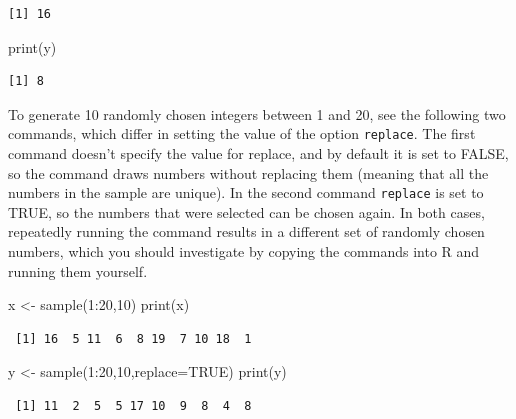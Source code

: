 \documentclass[
  letterpaper,
  DIV=11,
  numbers=noendperiod]{scrreprt}
\newenvironment{Shaded}{\begin{snugshade}}{\end{snugshade}}
\newcommand{\AttributeTok}[1]{\textcolor[rgb]{0.40,0.45,0.13}{#1}}
\newcommand{\ConstantTok}[1]{\textcolor[rgb]{0.56,0.35,0.01}{#1}}
\newcommand{\DecValTok}[1]{\textcolor[rgb]{0.68,0.00,0.00}{#1}}
\newcommand{\FunctionTok}[1]{\textcolor[rgb]{0.28,0.35,0.67}{#1}}
\newcommand{\NormalTok}[1]{\textcolor[rgb]{0.00,0.23,0.31}{#1}}
\newcommand{\OtherTok}[1]{\textcolor[rgb]{0.00,0.23,0.31}{#1}}
\newcommand{\SpecialCharTok}[1]{\textcolor[rgb]{0.37,0.37,0.37}{#1}}
\begin{document}
\begin{verbatim}
[1] 16
\end{verbatim}

\begin{Shaded}
\begin{Highlighting}[]
\FunctionTok{print}\NormalTok{(y)}
\end{Highlighting}
\end{Shaded}

\begin{verbatim}
[1] 8
\end{verbatim}

To generate 10 randomly chosen integers between 1 and 20, see the
following two commands, which differ in setting the value of the option
\texttt{replace}. The first command doesn't specify the value for
replace, and by default it is set to FALSE, so the command draws numbers
without replacing them (meaning that all the numbers in the sample are
unique). In the second command \texttt{replace} is set to TRUE, so the
numbers that were selected can be chosen again. In both cases,
repeatedly running the command results in a different set of randomly
chosen numbers, which you should investigate by copying the commands
into R and running them yourself.

\begin{Shaded}
\begin{Highlighting}[]
\NormalTok{x }\OtherTok{\textless{}{-}} \FunctionTok{sample}\NormalTok{(}\DecValTok{1}\SpecialCharTok{:}\DecValTok{20}\NormalTok{,}\DecValTok{10}\NormalTok{)}
\FunctionTok{print}\NormalTok{(x)}
\end{Highlighting}
\end{Shaded}

\begin{verbatim}
 [1] 16  5 11  6  8 19  7 10 18  1
\end{verbatim}

\begin{Shaded}
\begin{Highlighting}[]
\NormalTok{y }\OtherTok{\textless{}{-}} \FunctionTok{sample}\NormalTok{(}\DecValTok{1}\SpecialCharTok{:}\DecValTok{20}\NormalTok{,}\DecValTok{10}\NormalTok{,}\AttributeTok{replace=}\ConstantTok{TRUE}\NormalTok{)}
\FunctionTok{print}\NormalTok{(y)}
\end{Highlighting}
\end{Shaded}

\begin{verbatim}
 [1] 11  2  5  5 17 10  9  8  4  8
\end{verbatim}
\end{document}
